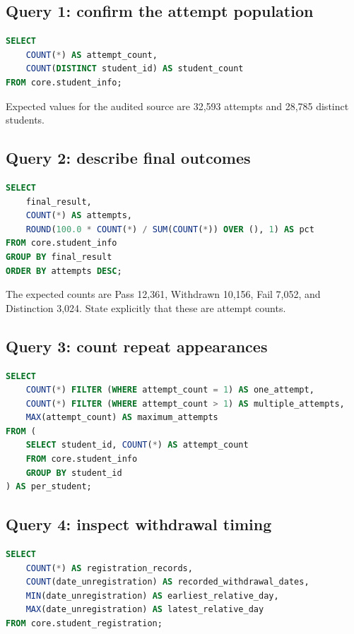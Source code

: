 \subsection{Query 1: confirm the attempt population}

\begin{lstlisting}[language=SQL]
SELECT
    COUNT(*) AS attempt_count,
    COUNT(DISTINCT student_id) AS student_count
FROM core.student_info;
\end{lstlisting}

Expected values for the audited source are 32,593 attempts and 28,785 distinct
students.

\subsection{Query 2: describe final outcomes}

\begin{lstlisting}[language=SQL]
SELECT
    final_result,
    COUNT(*) AS attempts,
    ROUND(100.0 * COUNT(*) / SUM(COUNT(*)) OVER (), 1) AS pct
FROM core.student_info
GROUP BY final_result
ORDER BY attempts DESC;
\end{lstlisting}

The expected counts are Pass 12,361, Withdrawn 10,156, Fail 7,052, and
Distinction 3,024. State explicitly that these are attempt counts.

\subsection{Query 3: count repeat appearances}

\begin{lstlisting}[language=SQL]
SELECT
    COUNT(*) FILTER (WHERE attempt_count = 1) AS one_attempt,
    COUNT(*) FILTER (WHERE attempt_count > 1) AS multiple_attempts,
    MAX(attempt_count) AS maximum_attempts
FROM (
    SELECT student_id, COUNT(*) AS attempt_count
    FROM core.student_info
    GROUP BY student_id
) AS per_student;
\end{lstlisting}

\subsection{Query 4: inspect withdrawal timing}

\begin{lstlisting}[language=SQL]
SELECT
    COUNT(*) AS registration_records,
    COUNT(date_unregistration) AS recorded_withdrawal_dates,
    MIN(date_unregistration) AS earliest_relative_day,
    MAX(date_unregistration) AS latest_relative_day
FROM core.student_registration;
\end{lstlisting}

